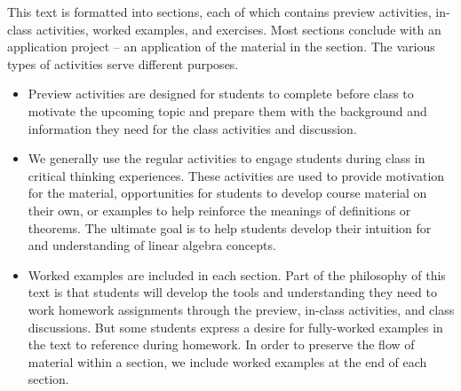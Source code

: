 
This text is formatted into sections, each of which contains preview activities, in-class activities, worked examples, and exercises. Most sections conclude with an application project -- an application of the material in the section. The various types of activities serve different purposes.
\begin{itemize}
\item Preview activities are designed for students to complete before class to motivate the upcoming topic and prepare them with the background and information they need for the class activities and discussion.
\item We generally use the regular activities to engage students during class in critical thinking experiences. These activities are used to provide motivation for the material, opportunities for students to develop course material on their own, or examples to help reinforce the meanings of definitions or theorems. The ultimate goal is to help students develop their intuition for and understanding of linear algebra concepts. 
\item Worked examples are included in each section. Part of the philosophy of this text is that students will develop the tools and understanding they need to work homework assignments through the preview, in-class activities, and class discussions. But some students express a desire for fully-worked examples in the text to reference during homework. In order to preserve the flow of material within a section, we include worked examples at the end of each section.  

\end{itemize}

